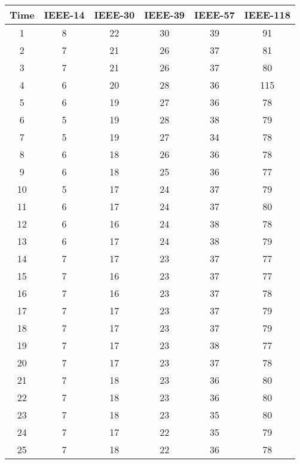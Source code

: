 \documentclass[10pt,journal,twocolumn]{IEEEtran}\IEEEoverridecommandlockouts
\begin{document}
\onecolumn
{
\begin{longtable}{|c|c|c|c|c|c|}\hline
   Time & IEEE-14 & IEEE-30 & IEEE-39 & IEEE-57 &  IEEE-118 \\ \hline
    1     & 8     & 22    & 30    & 39    & 91 \\ \hline
    2     & 7     & 21    & 26    & 37    & 81 \\ \hline
    3     & 7     & 21    & 26    & 37    & 80 \\ \hline
    4     & 6     & 20    & 28    & 36    & 115 \\ \hline
    5     & 6     & 19    & 27    & 36    & 78 \\ \hline
    6     & 5     & 19    & 28    & 38    & 79 \\ \hline
    7     & 5     & 19    & 27    & 34    & 78 \\ \hline
    8     & 6     & 18    & 26    & 36    & 78 \\ \hline
    9     & 6     & 18    & 25    & 36    & 77 \\ \hline
    10    & 5     & 17    & 24    & 37    & 79 \\ \hline
    11    & 6     & 17    & 24    & 37    & 80 \\\hline
    12    & 6     & 16    & 24    & 38    & 78 \\\hline
    13    & 6     & 17    & 24    & 38    & 79 \\\hline
    14    & 7     & 17    & 23    & 37    & 77 \\\hline
    15    & 7     & 16    & 23    & 37    & 77 \\\hline
    16    & 7     & 16    & 23    & 37    & 78 \\\hline
    17    & 7     & 17    & 23    & 37    & 79 \\\hline
    18    & 7     & 17    & 23    & 37    & 79 \\\hline
    19    & 7     & 17    & 23    & 38    & 77 \\\hline
    20    & 7     & 17    & 23    & 37    & 78 \\\hline
    21    & 7     & 18    & 23    & 36    & 80 \\\hline
    22    & 7     & 18    & 23    & 36    & 80 \\\hline
    23    & 7     & 18    & 23    & 35    & 80 \\\hline
    24    & 7     & 17    & 22    & 35    & 79 \\\hline
    25    & 7     & 18    & 22    & 36    & 78 \\\hline

\end{longtable}}
\end{document}
